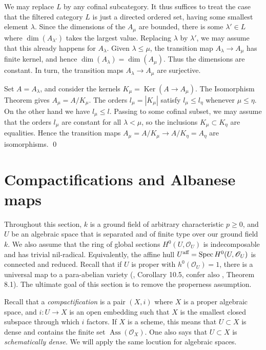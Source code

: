 \documentclass[oneside, 12pt]{amsart}
\newcommand\mylabel[1]{\label{#1}\marginpar{\vspace{-1ex}\medskip\medskip\footnotesize \tt #1}}
\renewcommand\mylabel[1]{\label{#1}}
\theoremstyle{definition}
\theoremstyle{remark}
\newcommand{\aff}{\text{\rm aff}}
\newcommand{\Ass}{\operatorname{Ass}}
\newcommand{\Kernel}{\operatorname{Ker}}
\renewcommand{\O}{\mathscr{O}}
\newcommand{\ra}{\rightarrow}
\newcommand{\Spec}{\operatorname{Spec}}
\begin{document}
\proof
We may replace $L$ by any cofinal subcategory. It thus suffices to treat the case that the filtered  category $L$
is just a directed ordered set, having some smallest element $\lambda$.
Since the dimensions of the $A_\mu$ are bounded, there is some $\lambda'\in L$
where $\dim(A_{\lambda'})$ takes the largest value. Replacing $\lambda$ by $\lambda'$, we may
assume that this already happens for $A_\lambda$.
Given $\lambda\leq \mu$, the transition map $A_\lambda\ra A_\mu$ has finite kernel,
and hence  $\dim(A_\lambda)= \dim(A_\mu)$.  Thus the dimensions  
are constant. In turn, the transition maps $A_\lambda\ra A_\mu$ are surjective. 

Set $A=A_\lambda$, and consider
the kernels $K_\mu=\Kernel(A\ra A_\mu)$. The Isomorphism Theorem
gives $A_\mu=A/K_\mu$.  The orders $l_\mu=|K_\mu|$
satisfy $l_\mu\leq l_\eta$ whenever $\mu\leq \eta$. On the other hand we have $l_\mu\leq l$.
Passing to some cofinal subset, we may assume that the orders $l_\mu$ are constant for all $\lambda<\mu$, so
the inclusions $K_\mu\subset K_\eta$ are equalities.
Hence the transition maps $A_\mu=A/K_\mu\ra  A/K_\eta=A_\eta$ are isomorphisms.
\qed


\section{Compactifications and Albanese maps}
\mylabel{Compactifications}

Throughout this section, $k$ is  a ground field of arbitrary characteristic $p\geq 0$, and $U$ be an algebraic space that is separated and of finite type over our ground
field $k$.
We also assume that the ring of global sections $H^0(U,\O_U)$ is  indecomposable and has trivial nil-radical.
Equivalently, the affine hull  $U^\aff=\Spec H^0(U,\O_U)$ is  connected and reduced.
Recall that if $U$ is proper with $h^0(\O_U)=1$, there is a universal map to a para-abelian variety
(\cite{Laurent; Schroeer 2021}, Corollary 10.5, confer also \cite{Brochard 2021}, Theorem 8.1).
The ultimate goal of this  section is to remove the  properness assumption.

Recall that a \emph{compactification}  is a pair $(X,i)$ where $X$ is a proper algebraic space,
and $i:U\ra X$ is an open embedding such that $X$ is the smallest closed subspace through which $i$ factors.
If $X$ is a scheme, this means that $U\subset X$ is dense and contains the finite set $\Ass(\O_X)$.
One also says that $U\subset X$ is \emph{schematically dense}.  We will apply the same locution 
for algebraic spaces.
\end{document}
